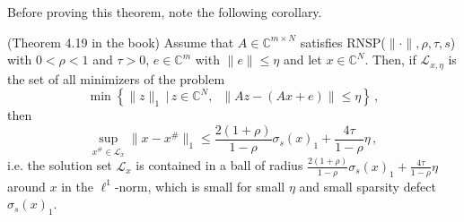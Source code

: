 \documentclass[11pt]{beamer}
\newcommand{\CC}{\mathbb{C}}
\begin{document}
\begin{frame}{}
Before proving this theorem, note the following corollary.
    \begin{Kor}
        {(Theorem 4.19 in the book)}{}
        Assume that \(A\in\CC^{m\times N}\) satisfies RNSP(\(\|\cdot\|,\rho,\tau,s\)) with \(0<\rho<1\) and \(\tau>0\), \(e\in\CC^m\) with \(\|e\|\le \eta\) and let \(x\in \CC^N\). Then, if \(\mathcal L_{x,\eta}\) is the set of all minimizers of the problem
		\[\min\left\{\|z\|_1\,\big|\,z\in \CC^N,\;\;\|Az-(Ax+e)\|\le \eta\right\}\,,\]
    	then 
        \[\sup_{x^{\#}\in \mathcal L_x}\|x-x^{\#}\|_1\le \frac{2(1+\rho)}{1-\rho}\sigma_s(x)_1+\frac{4\tau}{1-\rho}\eta\,,\]
        i.e. the solution set \(\mathcal L_x\) is contained in a ball of radius \(\frac{2(1+\rho)}{1-\rho}\sigma_s(x)_1+\frac{4\tau}{1-\rho}\eta\) around \(x\) in the \(\ell^1\)-norm, which is small for small \(\eta\) and small sparsity defect \(\sigma_s(x)_1\).
    \end{Kor}
\end{frame}


\end{document}
